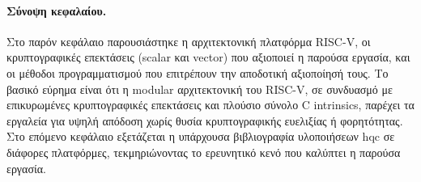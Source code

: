 \bigskip

\paragraph{Σύνοψη κεφαλαίου.}
Στο παρόν κεφάλαιο παρουσιάστηκε η αρχιτεκτονική πλατφόρμα RISC-V, οι
κρυπτογραφικές επεκτάσεις (scalar και vector) που αξιοποιεί η παρούσα
εργασία, και οι μέθοδοι προγραμματισμού που επιτρέπουν την αποδοτική
αξιοποίησή τους. Το βασικό εύρημα είναι ότι η modular αρχιτεκτονική του
RISC-V, σε συνδυασμό με επικυρωμένες κρυπτογραφικές επεκτάσεις και
πλούσιο σύνολο C intrinsics, παρέχει τα εργαλεία για υψηλή απόδοση
χωρίς θυσία κρυπτογραφικής ευελιξίας ή φορητότητας. Στο επόμενο κεφάλαιο
εξετάζεται η υπάρχουσα βιβλιογραφία υλοποιήσεων \gls{hqc} σε διάφορες
πλατφόρμες, τεκμηριώνοντας το ερευνητικό κενό που καλύπτει η παρούσα
εργασία.
